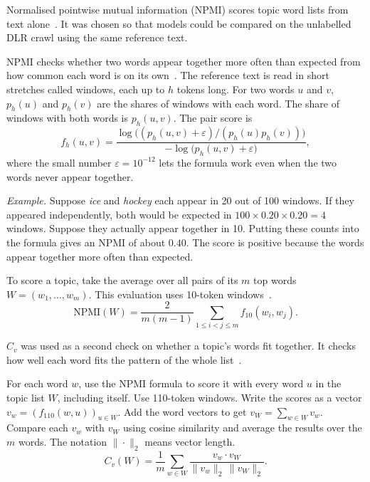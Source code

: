 \begin{description}[leftmargin=1.3em,style=nextline,itemsep=3pt]
\item[Word coherence from NPMI.]
Normalised pointwise mutual information (NPMI) scores topic word lists from text
alone~\cite[p.~533]{lau2014tealeaves}. It was chosen so that models could be compared on the
unlabelled DLR crawl using the same reference text.

NPMI checks whether two words appear together more
often than expected from how common each word is on its own~\cite[Eq.~(7)]{bouma2009npmi}.
The reference text is read in short stretches called windows, each up to $h$ tokens long.
For two words $u$ and $v$, $p_h(u)$ and $p_h(v)$ are the shares of windows with each word.
The share of windows with both words is $p_h(u,v)$. The pair score is
\[
  f_h(u,v)=
  \frac{\log\!\bigl((p_h(u,v)+\varepsilon)/(p_h(u)p_h(v))\bigr)}
       {-\log\!\bigl(p_h(u,v)+\varepsilon\bigr)},
\]
where the small number $\varepsilon=10^{-12}$ lets the formula work even when the two words
never appear together.

\emph{Example.} Suppose \emph{ice} and \emph{hockey} each appear in 20 out of 100 windows.
If they appeared independently, both would be expected in $100\times0.20\times0.20=4$ windows.
Suppose they actually appear together in 10. Putting these counts into the formula gives an
NPMI of about $0.40$. The score is positive because the words appear together more often
than expected.

To score a topic, take the average over all pairs of its $m$ top words
$W=(w_1,\ldots,w_m)$. This evaluation uses 10-token windows~\cite[Table~2]{roder2015coherence}.
\[
  \mathrm{NPMI}(W)=\frac{2}{m(m-1)}\sum_{1\le i<j\le m}f_{10}(w_i,w_j).
\]

\item[Word coherence from $C_v$.]
$C_v$ was used as a second check on whether a topic's words fit together. It checks how well
each word fits the pattern of the whole list~\cite[Eqs.~(34)--(35) and Table~2]{roder2015coherence}.

For each word $w$, use the NPMI formula to score it with every word $u$ in the topic list
$W$, including itself. Use 110-token windows. Write the scores as a vector
$v_w=(f_{110}(w,u))_{u\in W}$. Add the word vectors to get $v_W=\sum_{w\in W}v_w$.
Compare each $v_w$ with $v_W$ using cosine similarity and average the results over the
$m$ words. The notation $\|\cdot\|_2$ means vector length.
\[
  C_v(W)=\frac{1}{m}\sum_{w\in W}
  \frac{v_w\cdot v_W}{\|v_w\|_2\,\|v_W\|_2}.
\]


\end{description}
